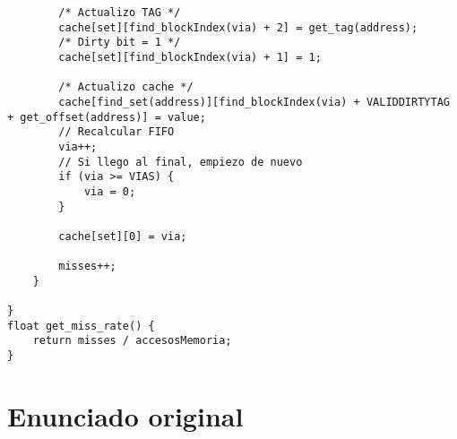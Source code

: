 \documentclass[a4paper, 10pt, twoside, notitlepage]{article}
\begin{document}
\begin{lstlisting}
        /* Actualizo TAG */
        cache[set][find_blockIndex(via) + 2] = get_tag(address);
        /* Dirty bit = 1 */
        cache[set][find_blockIndex(via) + 1] = 1;

        /* Actualizo cache */
        cache[find_set(address)][find_blockIndex(via) + VALIDDIRTYTAG + get_offset(address)] = value;
        // Recalcular FIFO
        via++;
        // Si llego al final, empiezo de nuevo
        if (via >= VIAS) {
            via = 0;
        }

        cache[set][0] = via;

        misses++;
    }

}
float get_miss_rate() {
    return misses / accesosMemoria;
}
\end{lstlisting}




\newpage
\section{Enunciado original}\label{sec:enunciado}

\end{document}
